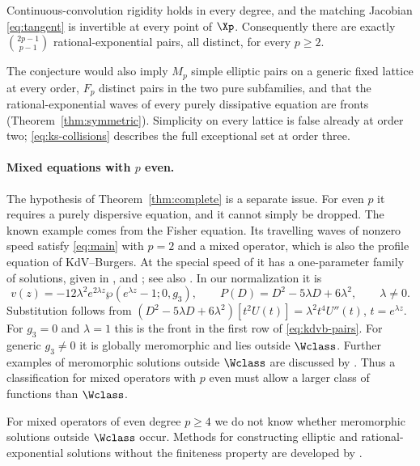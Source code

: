 \begin{conjecture}\label{conj:count}
Continuous-convolution rigidity holds in every degree, and the
matching Jacobian \eqref{eq:tangent} is invertible at every point
of \(\Xp\). Consequently there are exactly \(\binom{2p-1}{p-1}\)
rational-exponential pairs, all distinct, for every \(p\ge2\).
\end{conjecture}

The conjecture would also imply \(M_p\) simple elliptic pairs
on a generic fixed lattice at every order, \(F_p\) distinct pairs
in the two pure subfamilies, and that the rational-exponential waves of
every purely dissipative equation are fronts
(Theorem~\ref{thm:symmetric}).
Simplicity on every lattice is false already at order two;
\eqref{eq:ks-collisions} describes the full exceptional set
at order three.

\paragraph{Mixed equations with \(p\) even.}
The hypothesis of Theorem~\ref{thm:complete} is a separate issue. For
even \(p\) it requires a purely dispersive equation, and it cannot
simply be dropped. The known example comes from the Fisher equation.
Its travelling waves of nonzero speed satisfy \eqref{eq:main} with
\(p=2\) and a mixed operator, which is also the profile equation of
KdV--Burgers. At the
special speed of \citet{AblowitzZeppetella1979} it has a one-parameter
family of solutions, given in \citet{Kudryashov2010},
\citet[Lemma~4.4]{ConteNgWu2015} and
\citet{McCueElHachemSimpson2021}; see also
\citet{KudryashovFisher2005}. In our normalization it is
\[
 v(z)=-12\lambda^2e^{2\lambda z}
       \wp(e^{\lambda z}-1;0,g_3),\qquad
 P(D)=D^2-5\lambda D+6\lambda^2,\qquad\lambda\ne0.
\]
Substitution follows from
\((D^2-5\lambda D+6\lambda^2)[t^2U(t)]
=\lambda^2t^4U''(t)\), \(t=e^{\lambda z}\).
For \(g_3=0\) and \(\lambda=1\) this is the front in the first row of
\eqref{eq:kdvb-pairs}. For generic \(g_3\ne0\) it is globally
meromorphic and lies outside \(\Wclass\).
Further examples of meromorphic solutions outside \(\Wclass\)
are discussed by \citet[Remark~1.11]{NgWu2019}.
Thus a classification for mixed operators with \(p\) even must allow a
larger class of functions than \(\Wclass\).

For mixed operators of even degree \(p\ge4\) we do not know whether
meromorphic solutions outside \(\Wclass\) occur.
Methods for constructing elliptic and rational-exponential
solutions without the finiteness property are developed by
\citet{Demina2022}.
